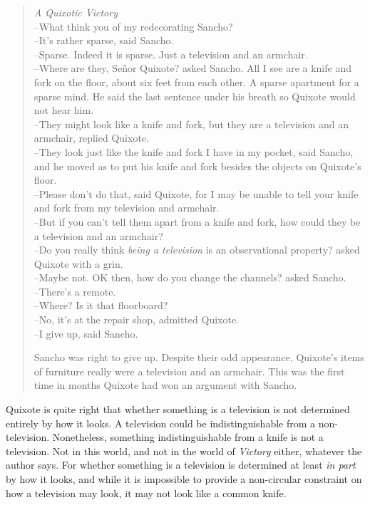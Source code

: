 \begin{quote}
\textit{A Quixotic Victory} \\
{}--What think you of my redecorating Sancho? \\
{}--It's rather sparse, said Sancho. \\
{}--Sparse. Indeed it is sparse. Just a television and an armchair. \\
{}--Where are they, Se\~nor Quixote? asked Sancho. All I see are a knife and fork on the floor, about six feet from each other. A sparse apartment for a sparse mind. He said the last sentence under his breath so Quixote would not hear him. \\
{}--They might look like a knife and fork, but they are a television and an armchair, replied Quixote. \\
{}--They look just like the knife and fork I have in my pocket, said Sancho, and he moved as to put his knife and fork besides the objects on Quixote's floor. \\
{}--Please don't do that, said Quixote, for I may be unable to tell your knife and fork from my television and armchair. \\
{}--But if you can't tell them apart from a knife and fork, how could they be a television and an armchair? \\
{}--Do you really think \textit{being a television} is an observational property? asked Quixote with a grin. \\
{}--Maybe not. OK then, how do you change the channels? asked Sancho. \\
{}--There's a remote. \\
{}--Where? Is it that floorboard? \\
{}--No, it's at the repair shop, admitted Quixote. \\
{}--I give up, said Sancho.\\
\medskip

\noindent Sancho was right to give up. Despite their odd appearance, Quixote's items of furniture really were a television and an armchair. This was the first time in months Quixote had won an argument with Sancho.
\end{quote}

\noindent Quixote is quite right that whether something is a television is not determined entirely by how it looks. A television could be indistinguishable from a non-television. Nonetheless, something indistinguishable from a knife is not a television. Not in this world, and not in the world of \textit{Victory} either, whatever the author says. For whether something is a television is determined at least \textit{in part }by how it looks, and while it is impossible to provide a non-circular constraint on how a television may look, it may not look like a common knife. 

